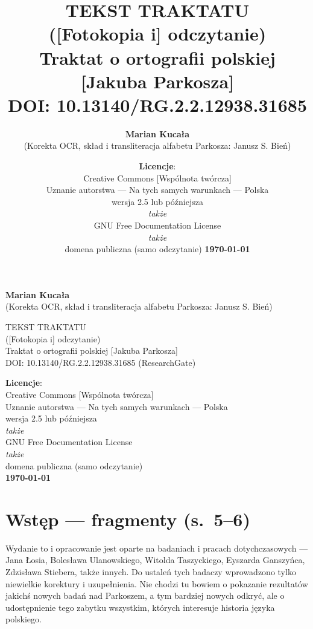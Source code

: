 \documentclass[dvipsnames,12pt]{report}
\author{\textbf{Marian Kucała}\\(Korekta OCR, skład i transliteracja alfabetu Parkosza: Janusz S. Bień)}
\title{TEKST TRAKTATU\\[-.5ex]([Fotokopia i] odczytanie)\\[-.5ex]Traktat o ortografii polskiej [Jakuba Parkosza]\\DOI: 10.13140/RG.2.2.12938.31685}
\date{\textbf{Licencje}:\\ \relsize{-1}Creative Commons [Wspólnota twórcza]\\[-.4ex]
Uznanie autorstwa --- Na tych samych warunkach --- Polska\\
wersja 2.5 lub późniejsza\\\textit{także}\\
GNU Free Documentation License\\\textit{także}\\
domena publiczna (samo odczytanie)
\textbf{\today}}
\begin{document}
\thispagestyle{empty}

\begin{titlepage}
{\textbf{Marian Kucała}\\(Korekta OCR, skład i transliteracja alfabetu Parkosza: Janusz S. Bień)} 

\vfill
{
{TEKST TRAKTATU\\[-.5ex]([Fotokopia i] odczytanie)\\[-.5ex]Traktat o ortografii polskiej [Jakuba Parkosza]}\\DOI: 10.13140/RG.2.2.12938.31685 (ResearchGate)}

\vfill
{\textbf{Licencje}:\\ Creative Commons [Wspólnota twórcza]\\[-.4ex]
Uznanie autorstwa --- Na tych samych warunkach --- Polska\\
wersja 2.5 lub późniejsza\\\textit{także}\\
GNU Free Documentation License\\\textit{także}\\
domena publiczna (samo odczytanie)\\
\textbf{\today}}

\end{titlepage}

{}



\raggedright

\section*{Wstęp --- fragmenty (s.~5--6)}
\label{sec:wstp}
Wydanie to i opracowanie jest oparte na badaniach i pracach
dotychczasowych — Jana Łosia, Bolesława Ulanowskiego, Witolda
Taszyckiego, Eyszarda Ganszyńca, Zdzisława Stiebera, także innych. Do
ustaleń tych badaczy wprowadzono tylko niewielkie korektury i
uzupełnienia. Nie chodzi tu bowiem o pokazanie rezultatów jakichś
nowych badań nad Parkoszem, a tym bardziej nowych odkryć, ale o
udostępnienie tego zabytku wszystkim, których interesuje historia
języka polskiego.
\end{document}
